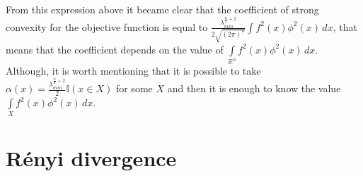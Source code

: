 \documentclass{article}
\begin{document}
From this expression above it became clear that the coefficient of strong convexity for the objective function is equal to $ \frac{\lambda_{min}^{\frac n2 + 2}}{2\sqrt{(2\pi)^n}} \int f^2(x)\phi^2(x)\, dx$, that means that the coefficient depends on the value of $\int \limits_{\mathbb{R}^n} f^2(x)\phi^2(x)\, dx$. Although, it is worth mentioning that it is possible to take $\alpha(x) = \frac{\lambda_{min}^{\frac{n}{2} + 2}}{2} \mathbb{I}(x \in X)$ for some $X$ and then it is enough to know the value $\int \limits_X f^2(x)\phi^2(x)\, dx$.

 


\section*{R\'enyi divergence}


\newpage

 



\end{document}
